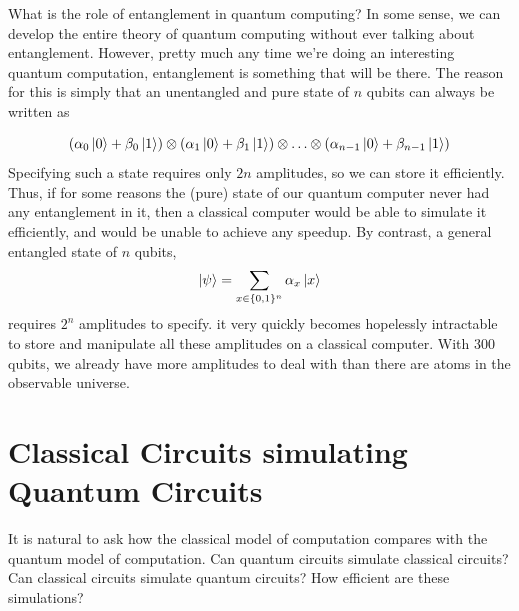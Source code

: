 What is the role of entanglement in quantum computing? In some sense, we can develop the entire theory of quantum computing without ever talking about entanglement. However, pretty much any time we're doing an interesting quantum computation, entanglement is something that will be there. The reason for this is simply that an unentangled and pure state of $n$ qubits can always be written as

\[
(\alpha_0\ket{0}+\beta_0\ket{1})\otimes (\alpha_1\ket{0}+\beta_1\ket{1})\otimes \ldots \otimes (\alpha_{n-1}\ket{0}+\beta_{n-1}\ket{1})
\]
Specifying such a state requires only $2n$ amplitudes, so we can store it efficiently. Thus, if for some reasons the (pure) state of our quantum computer never had any entanglement in it, then a classical computer would be able to simulate it efficiently, and would be unable to achieve any speedup. By contrast, a general entangled state of $n$ qubits,
\[
\ket{\psi}=\sum_{x\in\{0,1\}^n} \alpha_x\ket{x}
\]
requires $2^n$ amplitudes to specify. it very quickly becomes hopelessly intractable to store and manipulate all these amplitudes on a classical computer. With 300 qubits, we already have more amplitudes to deal with than there are atoms in the observable universe.



\section{Classical Circuits simulating Quantum Circuits}
It is natural to ask how the classical model of computation compares with the quantum model of computation. Can quantum circuits simulate classical circuits? Can classical circuits simulate quantum circuits? How efficient are these simulations?

